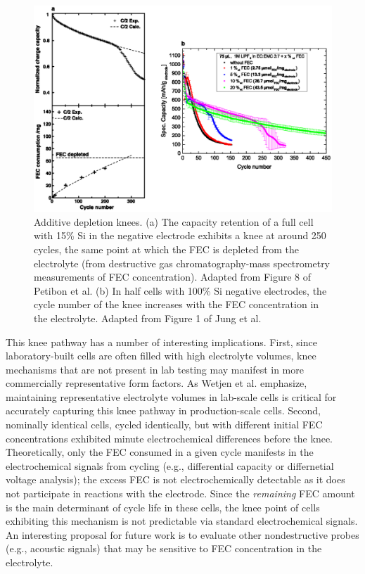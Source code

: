\documentclass[journal=jpcl, manuscript=article, layout=onecolumn]{achemso}
\begin{document}
\begin{figure}[ht]
\centering
\includegraphics[scale = 0.7]{figures/fec_depletion.eps}
\caption{Additive depletion knees.
(a) The capacity retention of a full cell with 15\% Si in the negative electrode exhibits a knee at around 250 cycles, the same point at which the FEC is depleted from the electrolyte (from destructive gas chromatography-mass spectrometry measurements of FEC concentration). Adapted from Figure 8 of Petibon et al.\cite{petibon_studies_2016}
(b) In half cells with 100\% Si negative electrodes, the cycle number of the knee increases with the FEC concentration in the electrolyte. Adapted from Figure 1 of Jung et al.\cite{jung_consumption_2016}}
\label{fig:fec_knee}
\end{figure}

This knee pathway has a number of interesting implications.
First, since laboratory-built cells are often filled with high electrolyte volumes, knee mechanisms that are not present in lab testing may manifest in more commercially representative form factors.
As Wetjen et al.\cite{wetjen_differentiating_2017} emphasize,
maintaining representative electrolyte volumes in lab-scale cells is critical for accurately capturing this knee pathway in production-scale cells.
Second, nominally identical cells, cycled identically, but with different initial FEC concentrations exhibited minute electrochemical differences before the knee.\cite{jung_consumption_2016}
Theoretically, only the FEC consumed in a given cycle manifests in the electrochemical signals from cycling (e.g., differential capacity or differnetial voltage analysis); the excess FEC is not electrochemically detectable as it does not participate in reactions with the electrode.
Since the \emph{remaining} FEC amount is the main determinant of cycle life in these cells, the knee point of cells exhibiting this mechanism is not predictable via standard electrochemical signals.
An interesting proposal for future work is to evaluate other nondestructive probes (e.g., acoustic signals\cite{knehr_understanding_2018}) that may be sensitive to FEC concentration in the electrolyte.
\end{document}
